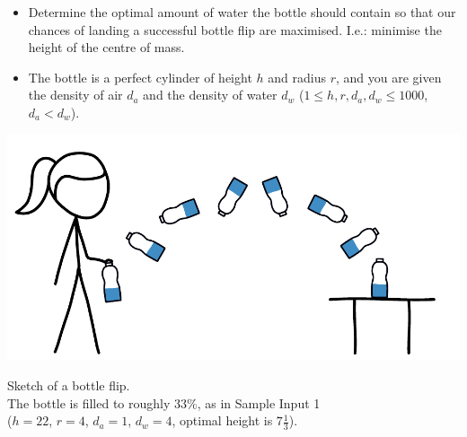 \begin{frame}
    \frametitle{\problemtitle}

    \begin{columns}
        \begin{column}[T]{.70\textwidth}
            \begin{itemize}
                \item Determine the optimal amount of water the bottle should contain
                so that our chances of landing a successful bottle flip are maximised.
                    I.e.: minimise the height of the centre of mass.
                \item The bottle is a perfect cylinder of height $h$ and radius $r$,
                and you are given the density of air $d_a$ and the density of water $d_w$
                ($1 \leq h, r, d_a, d_w \leq 1000$, $d_a < d_w$).
            \end{itemize}

            \vspace{2em}

            \centering
            \includegraphics[height=.3\textheight]{sketch}

            \small
            Sketch of a bottle flip. \\
            The bottle is filled to roughly $33\%$, as in Sample Input 1 \\
            ($h = 22$, $r = 4$, $d_a = 1$, $d_w = 4$, optimal height is $7\frac13$).
        \end{column}

    \end{columns}
\end{frame}
